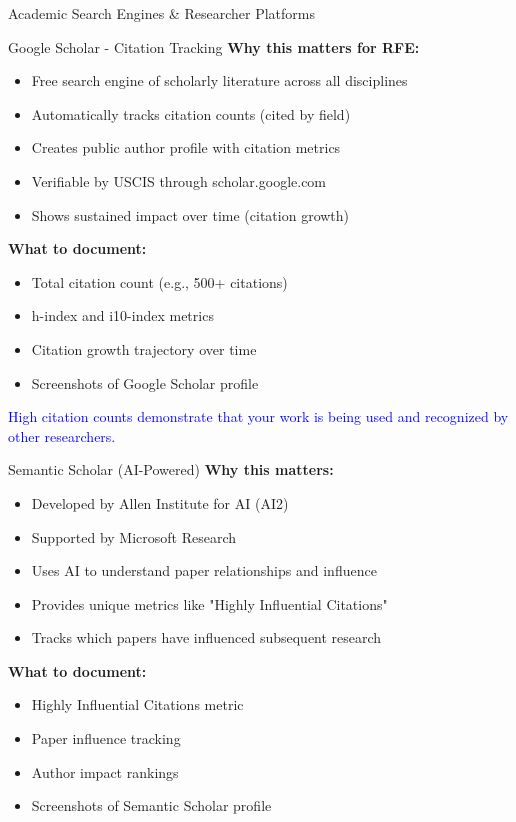 \documentclass[11pt]{beamer}
\begin{document}
	\begin{frame}{Academic Search Engines \& Researcher Platforms}
		\scriptsize
		\begin{block}{Google Scholar - Citation Tracking}
			\textbf{Why this matters for RFE:}
			\begin{itemize}
				\item Free search engine of scholarly literature across all disciplines
				\item Automatically tracks citation counts (cited by field)
				\item Creates public author profile with citation metrics
				\item Verifiable by USCIS through scholar.google.com
				\item Shows sustained impact over time (citation growth)
			\end{itemize}
			\textbf{What to document:}
			\begin{itemize}
				\item Total citation count (e.g., 500+ citations)
				\item h-index and i10-index metrics
				\item Citation growth trajectory over time
				\item Screenshots of Google Scholar profile
			\end{itemize}
			\textcolor{blue}{High citation counts demonstrate that your work is being used and recognized by other researchers.}
		\end{block}
		
		\begin{block}{Semantic Scholar (AI-Powered)}
			\textbf{Why this matters:}
			\begin{itemize}
				\item Developed by Allen Institute for AI (AI2)
				\item Supported by Microsoft Research
				\item Uses AI to understand paper relationships and influence
				\item Provides unique metrics like "Highly Influential Citations"
				\item Tracks which papers have influenced subsequent research
			\end{itemize}
			\textbf{What to document:}
			\begin{itemize}
				\item Highly Influential Citations metric
				\item Paper influence tracking
				\item Author impact rankings
				\item Screenshots of Semantic Scholar profile
			\end{itemize}
		\end{block}
	\end{frame}
	
\end{document}

